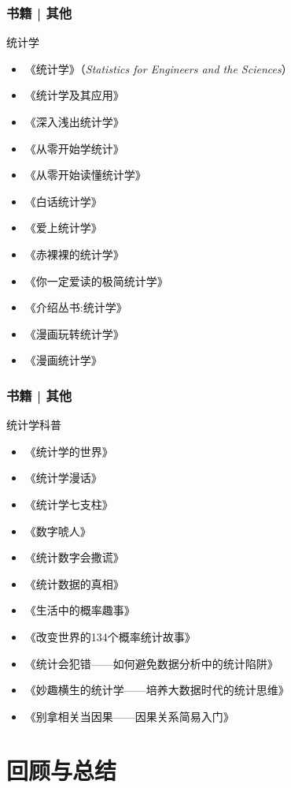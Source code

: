 \begin{frame}
  \frametitle{书籍 | 其他}
    \begin{block}{统计学}
    \begin{itemize}
      \item 《统计学》（\textit{Statistics for Engineers and the Sciences}）
      \item 《统计学及其应用》
      \item 《深入浅出统计学》
      \item 《从零开始学统计》
      \item 《从零开始读懂统计学》
      \item 《白话统计学》
      \item 《爱上统计学》
      \item \alert{《赤裸裸的统计学》}
      \item 《你一定爱读的极简统计学》
      \item 《介绍丛书:统计学》
      \item 《漫画玩转统计学》
      \item 《漫画统计学》
    \end{itemize}
  \end{block}
\end{frame}

\begin{frame}
  \frametitle{书籍 | 其他}
    \begin{block}{统计学科普}
      \begin{itemize}
      \item 《统计学的世界》
      \item 《统计学漫话》
      \item 《统计学七支柱》
      \item 《数字唬人》
      \item 《统计数字会撒谎》
      \item 《统计数据的真相》
      \item 《生活中的概率趣事》
      \item 《改变世界的134个概率统计故事》
      \item 《统计会犯错——如何避免数据分析中的统计陷阱》
      \item 《妙趣横生的统计学——培养大数据时代的统计思维》
      \item 《别拿相关当因果——因果关系简易入门》
      \end{itemize}
    \end{block}
\end{frame}

\section{回顾与总结}
